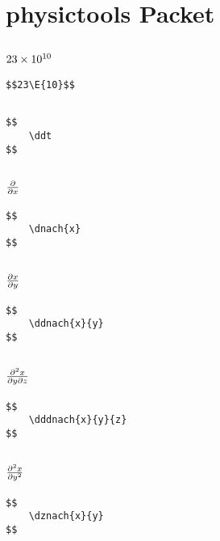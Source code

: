 \documentclass[a4paper]{article}
\begin{document}
\section{physictools Packet}


\subsection{$23 \times 10^{10}$}

\begin{verbatim}
$$23\E{10}$$
\end{verbatim}

\subsection{\ddt}

\begin{verbatim}
$$
	\ddt
$$
\end{verbatim}

\subsection{$ \frac{\partial}{\partial x}$}

\begin{verbatim}
$$
	\dnach{x}
$$
\end{verbatim}

\subsection{$ \frac{\partial x}{\partial y}$}

\begin{verbatim}
$$
	\ddnach{x}{y}
$$
\end{verbatim}


\subsection{$ \frac{\partial^2 x}{\partial y \partial z}$}

\begin{verbatim}
$$
	\dddnach{x}{y}{z}
$$
\end{verbatim}

\subsection{$ \frac{\partial^2 x}{\partial y^2}$}

\begin{verbatim}
$$
	\dznach{x}{y}
$$
\end{verbatim}
\end{document}

